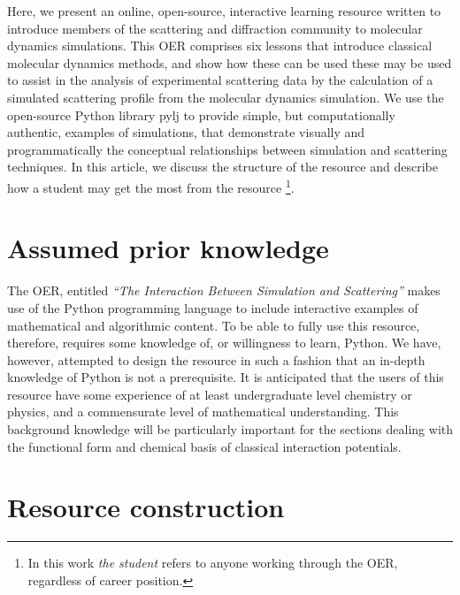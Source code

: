 \documentclass[amsmath,amssymb,twocolumn,superscriptaddress]{revtex4-1}
\begin{document}
Here, we present an online, open-source, interactive learning resource written to introduce members of the scattering and diffraction community to molecular dynamics simulations.
This OER comprises six lessons that introduce classical molecular dynamics methods, and show how these can be used these may be used to assist in the analysis of experimental scattering data by the calculation of a simulated scattering profile from the molecular dynamics simulation.
We use the open-source Python library pylj \cite{mccluskey_pylj_2018} to provide simple, but computationally authentic, examples of simulations, that demonstrate visually and programmatically the conceptual relationships between simulation and scattering techniques.
In this article, we discuss the structure of the resource and describe how a student may get the most from the resource \footnote{In this work \emph{the student} refers to anyone working through the OER, regardless of career position.}.

\section{Assumed prior knowledge}

The OER, entitled \emph{``The Interaction Between Simulation and Scattering''} makes use of the Python programming language to include interactive examples of mathematical and algorithmic content.
To be able to fully use this resource, therefore, requires some knowledge of, or willingness to learn, Python.
We have, however, attempted to design the resource in such a fashion that an in-depth knowledge of Python is not a prerequisite.
It is anticipated that the users of this resource have some experience of at least undergraduate level chemistry or physics, and a commensurate level of mathematical understanding.
This background knowledge will be particularly important for the sections dealing with the functional form and chemical basis of classical interaction potentials.

\section{Resource construction}
\end{document}
